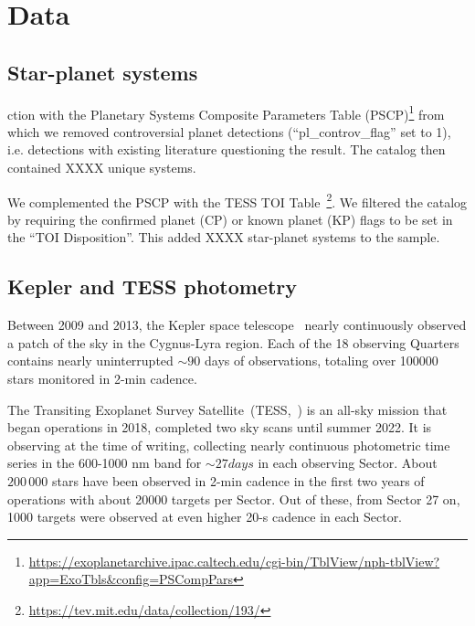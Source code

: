 \documentclass[twocolumn]{aastex631}
\begin{document}
\section{Data}
\label{sec:data}
\subsection{Star-planet systems}


ction with the Planetary Systems Composite Parameters Table (PSCP)\footnote{ \url{https://exoplanetarchive.ipac.caltech.edu/cgi-bin/TblView/nph-tblView?app=ExoTbls&config=PSCompPars}} from which we removed controversial planet detections (``pl\_controv\_flag'' set to 1), i.e. detections with existing literature questioning the result. The catalog then contained XXXX unique systems.

We complemented the PSCP with the TESS TOI Table~\citep[TT][]{guerrero2021arxiv}\footnote{\url{https://tev.mit.edu/data/collection/193/}}. We filtered the catalog by requiring the confirmed planet (CP) or known planet (KP) flags to be set in the ``TOI Disposition''. This added XXXX star-planet systems to the sample.

\subsection{Kepler and TESS photometry}
Between 2009 and 2013, the Kepler space telescope~\citep{koch2010kepler} nearly continuously observed a patch of the sky in the Cygnus-Lyra region. Each of the 18 observing Quarters contains nearly uninterrupted $\sim 90$ days of observations, totaling over 100000 stars monitored in 2-min cadence. 

The Transiting Exoplanet Survey Satellite~(TESS,~\cite{ricker2015transiting}) is an all-sky mission that began operations in 2018, completed two sky scans until summer 2022. It is observing at the time of writing, collecting nearly continuous photometric time series in the 600-1000 nm band for $\sim 27 days$ in each observing Sector. About $200\,000$ stars have been observed in 2-min cadence in the first two years of operations with about 20000 targets per Sector. Out of these, from Sector 27 on, 1000 targets were observed at even higher 20-s cadence in each Sector. 
\end{document}
